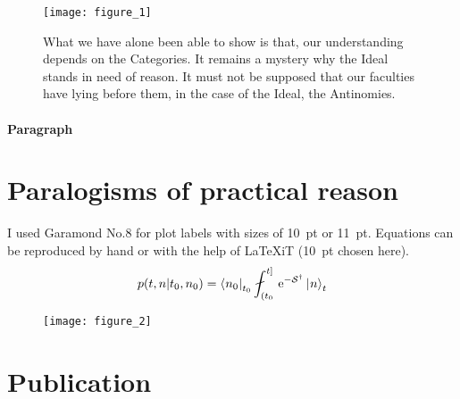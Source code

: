     		\kant[6]
			\begin{figure}[tb] 
				\centering
				\texttt{[image: figure\_1]}
				\caption[Short caption for the list of figures]{\label{fig:figure_1}
					What we have alone been able to show is that, our understanding depends on the Categories. It remains a mystery why the Ideal stands in need of reason. It must not be supposed that our faculties have lying before them, in the case of the Ideal, the Antinomies.
				}
			\end{figure}    

			\paragraph{Paragraph}\label{par:1_ghi}
				
				\kant[13-15]
				
\section{Paralogisms of practical reason}\label{sec:second_section}

	I used Garamond No.8 for plot labels with sizes of 10~pt or 11~pt. Equations can be reproduced by hand or with the help of LaTeXiT (10~pt chosen here).
	{\footnotesize\begin{equation}
		p(t, n | t_0, n_0) = \braA{n_0}_{t_0} \fint_{(t_0}^{t]} \, \ee^{-\mathcal{S}^\dagger} \, \ketA{n}_{t}  
	\end{equation}}
	\begin{figure}[h!] 
	    \vspace{-7mm}
		\centering
		\texttt{[image: figure\_2]}
		\caption[Equations in Illustrator/LaTeXiT]{\label{fig:figure_2}
		}
	\end{figure}    
    
    \kant[9]
    
	\cleardoubleemptypage

	\markright{}
	\section[Publication in \textit{Mathematische Annalen}: The ontological manuals]{Publication}\label{sec:1_chapter_MathAnn}

